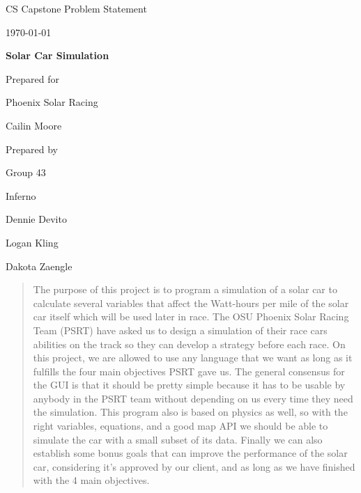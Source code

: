 \documentclass[onecolumn, draftclsnofoot,10pt, compsoc]{IEEEtran}
\def \CapstoneTeamName{		Inferno}
\def \CapstoneTeamNumber{		43}
\def \GroupMemberOne{			Dennie Devito}
\def \GroupMemberTwo{			Logan Kling}
\def \GroupMemberThree{			Dakota Zaengle}
\def \CapstoneProjectName{		Solar Car Simulation}
\def \CapstoneSponsorCompany{	Phoenix Solar Racing}
\def \CapstoneSponsorPerson{		Cailin Moore}
\def \DocType{		Problem Statement
				}
\newcommand{\NameSigPair}[1]{\par
\makebox[2.75in][r]{#1} \hfil 	\makebox[3.25in]{\makebox[2.25in]{\hrulefill} \hfill		\makebox[.75in]{\hrulefill}}
\par\vspace{-12pt} \textit{\tiny\noindent
\makebox[2.75in]{} \hfil		\makebox[3.25in]{\makebox[2.25in][r]{Signature} \hfill	\makebox[.75in][r]{Date}}}}
\renewcommand{\NameSigPair}[1]{#1}
\begin{document}
\begin{titlepage}
    \begin{singlespace}
        \hfill 
        \par\vspace{.2in}
        \centering
        \scshape{
            \huge CS Capstone \DocType \par
            {\large\today}\par
            \vspace{.5in}
            \textbf{\Huge\CapstoneProjectName}\par
            \vfill
            {\large Prepared for}\par
            \Huge \CapstoneSponsorCompany\par
            \vspace{5pt}
            {\Large\NameSigPair{\CapstoneSponsorPerson}\par}
            {\large Prepared by }\par
            Group\CapstoneTeamNumber\par
            \CapstoneTeamName\par 
            \vspace{5pt}
            {\Large
                \NameSigPair{\GroupMemberOne}\par
                \NameSigPair{\GroupMemberTwo}\par
                \NameSigPair{\GroupMemberThree}\par
            }
            \vspace{20pt}
        }
        \begin{abstract}
        	The purpose of this project is to program a simulation of a solar car to calculate several variables that affect the Watt-hours per mile of the solar car itself which will be used later in race. 
        	The OSU Phoenix Solar Racing Team (PSRT) have asked us to design a simulation of their race cars abilities on the track so they can develop a strategy before each race. 
        	On this project, we are allowed to use any language that we want as long as it fulfills the four main objectives PSRT gave us. 
        	The general consensus for the GUI is that it should be pretty simple because it has to be usable by anybody in the PSRT team without depending on us every time they need the simulation. 
        	This program also is based on physics as well, so with the right variables, equations, and a good map API we should be able to simulate the car with a small subset of its data. 
        	Finally we can also establish some bonus goals that can improve the performance of the solar car, considering it's approved by our client, and as long as we have finished with the 4 main objectives.

        \end{abstract}     
    \end{singlespace}
\end{titlepage}
\end{document}
